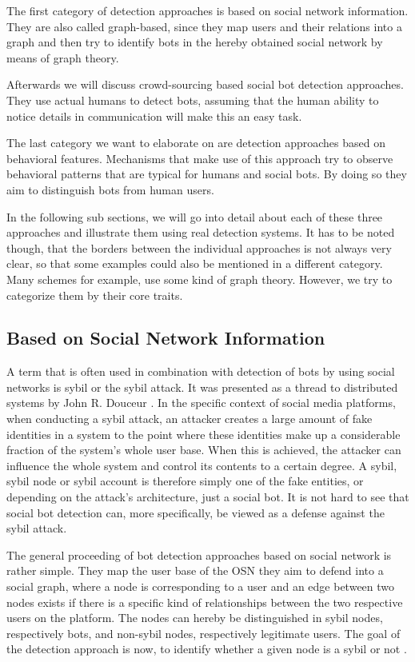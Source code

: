 The first category of detection approaches is based on social network information. They are also called graph-based, since they map users and their relations into a graph and then try to identify bots in the hereby obtained social network by means of graph theory. 

Afterwards we will discuss crowd-sourcing based social bot detection approaches. They use actual humans to detect bots, assuming that the human ability to notice details in communication will make this an easy task.

The last category we want to elaborate on are detection approaches based on behavioral features. Mechanisms that make use of this approach try to observe behavioral patterns that are typical for humans and social bots. By doing so they aim to distinguish bots from human users. 

In the following sub sections, we will go into detail about each of these three approaches and illustrate them using real detection systems. It has to be noted though, that the borders between the individual approaches is not always very clear, so that some examples could also be mentioned in a different category. Many schemes for example, use some kind of graph theory. However, we try to categorize them by their core traits.

\subsection{Based on Social Network Information}
A term that is often used in combination with detection of bots by using social networks is sybil or the sybil attack. It was presented as a thread to distributed systems by John R. Douceur \cite{sybil}. In the specific context of social media platforms, when conducting a sybil attack, an attacker creates a large amount of fake identities in a system to the point where these identities make up a considerable fraction of the system's whole user base. When this is achieved, the attacker can influence the whole system and control its contents to a certain degree. A sybil, sybil node or sybil account is therefore simply one of the fake entities, or depending on the attack's architecture, just a social bot. It is not hard to see that social bot detection can, more specifically, be viewed as a defense against the sybil attack.   

The general proceeding of bot detection approaches based on social network is rather simple. They map the user base of the OSN they aim to defend into a social graph, where a node is corresponding to a user and an edge between two nodes exists if there is a specific kind of relationships between the two respective users on the platform. The nodes can hereby be distinguished in sybil nodes, respectively bots, and non-sybil nodes, respectively legitimate users. The goal of the detection approach is now, to identify whether a given node is a sybil or not \cite{comparison}.


